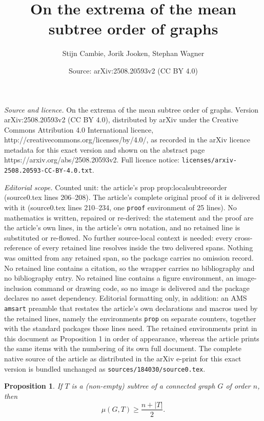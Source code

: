 \documentclass[10pt,a4paper]{amsart}
\title{On the extrema of the mean subtree order of graphs}
\author{Stijn Cambie, Jorik Jooken, Stephan Wagner}
\date{Source: arXiv:2508.20593v2 (CC BY 4.0)}
\newtheorem{prop}{Proposition}
\newcommand*{\abs}[1]{\lvert #1\rvert}
\begin{document}
\maketitle

\noindent\emph{Source and licence.} On the extrema of the mean subtree order of graphs. Version arXiv:2508.20593v2 (CC BY 4.0), distributed by arXiv under the Creative Commons Attribution 4.0 International licence, http://creativecommons.org/licenses/by/4.0/, as recorded in the arXiv licence metadata for this exact version and shown on the abstract page https://arxiv.org/abs/2508.20593v2. Full licence notice: \texttt{licenses/arxiv-2508.20593-CC-BY-4.0.txt}.\par\smallskip

\noindent\textit{Editorial scope.} Counted unit: the article's prop prop:localsubtreeorder (source0.tex lines 206--208). The article's complete original proof of it is delivered with it (source0.tex lines 210--234, one \texttt{proof} environment of 25 lines). No mathematics is written, repaired or re-derived: the statement and the proof are the article's own lines, in the article's own notation, and no retained line is substituted or re-flowed.  No further source-local context is needed: every cross-reference of every retained line resolves inside the two delivered spans.  Nothing was omitted from any retained span, so the package carries no omission record.  No retained line contains a citation, so the wrapper carries no bibliography and no bibliography entry.  No retained line contains a figure environment, an image-inclusion command or drawing code, so no image is delivered and the package declares no asset dependency.  Editorial formatting only, in addition: an AMS \texttt{amsart} preamble that restates the article's own declarations and macros used by the retained lines, namely the environments \texttt{prop} on separate counters, together with the standard packages those lines need.  The retained environments print in this document as Proposition 1 in order of appearance, whereas the article prints the same items with the numbering of its own full document.  The complete native source of the article as distributed in the arXiv e-print for this exact version is bundled unchanged as \texttt{sources/184030/source0.tex}.
\begin{prop}\label{prop:localsubtreeorder} If $T$ is a (non-empty) subtree of a connected graph $G$ of order $n$, then
\[\mu(G,T) \ge \frac{n+\abs{T}}{2}.\]
\end{prop}
\end{document}

